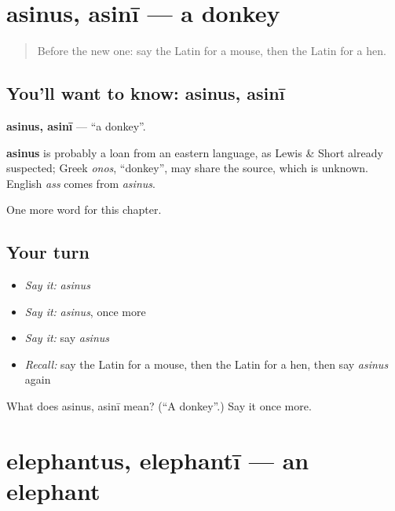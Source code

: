 \section[asinus, asinī]{asinus, asinī — a donkey}

\label{lesson:LA-C92-asinus}



\begin{quote}
Before the new one: say the Latin for a mouse, then the Latin for a hen.
\end{quote}

\subsection*{You'll want to know: asinus, asinī}
\textbf{asinus, asinī} — \textquotedblleft{}a donkey\textquotedblright{}.

\begin{cousinweb}
\textbf{asinus} is probably a loan from an eastern language, as Lewis \& Short already suspected; Greek \emph{onos}, \textquotedblleft{}donkey\textquotedblright{}, may share the source, which is unknown. English \emph{ass} comes from \emph{asinus}.
\end{cousinweb}

\begin{grammarlens}[title={What you've built}]
One more word for this chapter.
\end{grammarlens}

\subsection*{Your turn}
\begin{itemize}
\raggedright
  \item \emph{Say it:} \emph{asinus}
  \item \emph{Say it:} \emph{asinus}, once more
  \item \emph{Say it:} say \emph{asinus}
  \item \emph{Recall:} say the Latin for a mouse, then the Latin for a hen, then say \emph{asinus} again
\end{itemize}

\begin{tcolorbox}[breakable,colback=teal!4,colframe=teal!35!black,title={Before you move on}]
What does asinus, asinī mean? (\textquotedblleft{}A donkey\textquotedblright{}.) Say it once more.
\end{tcolorbox}
\section[elephantus, elephantī]{elephantus, elephantī — an elephant}

